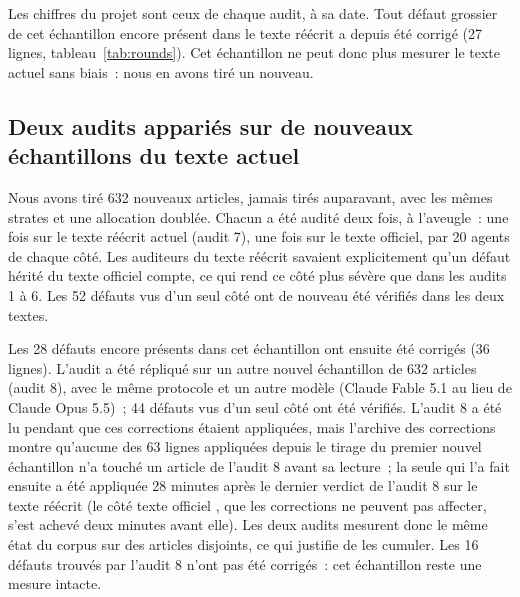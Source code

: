 \documentclass[11pt,a4paper]{article}
\begin{document}
Les chiffres du projet sont ceux de chaque audit, à sa date. Tout défaut grossier de cet échantillon encore présent dans le texte réécrit a depuis été corrigé (27 lignes, tableau~\ref{tab:rounds}). Cet échantillon ne peut donc plus mesurer le texte actuel sans biais~: nous en avons tiré un nouveau.

\subsection{Deux audits appariés sur de nouveaux échantillons du texte actuel}
\label{sec:fresh}

Nous avons tiré 632 nouveaux articles, jamais tirés auparavant, avec les mêmes strates et une allocation doublée. Chacun a été audité deux fois, à l'aveugle~: une fois sur le texte réécrit actuel (audit 7), une fois sur le texte officiel, par 20 agents de chaque côté. Les auditeurs du texte réécrit savaient explicitement qu'un défaut hérité du texte officiel compte, ce qui rend ce côté plus sévère que dans les audits 1 à 6. Les 52 défauts vus d'un seul côté ont de nouveau été vérifiés dans les deux textes.

Les 28 défauts encore présents dans cet échantillon ont ensuite été corrigés (36 lignes). L'audit a été répliqué sur un autre nouvel échantillon de 632 articles (audit 8), avec le même protocole et un autre modèle (Claude Fable 5.1 au lieu de Claude Opus 5.5)~; 44 défauts vus d'un seul côté ont été vérifiés. L'audit 8 a été lu pendant que ces corrections étaient appliquées, mais l'archive des corrections montre qu'aucune des 63 lignes appliquées depuis le tirage du premier nouvel échantillon n'a touché un article de l'audit 8 avant sa lecture~; la seule qui l'a fait ensuite a été appliquée 28 minutes après le dernier verdict de l'audit 8 sur le texte réécrit (le côté \og texte officiel \fg{}, que les corrections ne peuvent pas affecter, s'est achevé deux minutes avant elle). Les deux audits mesurent donc le même état du corpus sur des articles disjoints, ce qui justifie de les cumuler. Les 16 défauts trouvés par l'audit 8 n'ont pas été corrigés~: cet échantillon reste une mesure intacte.
\end{document}
